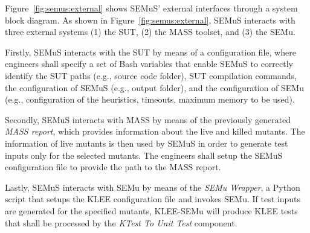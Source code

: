 Figure~\ref{fig:semus:external} shows SEMuS' external interfaces through a system block diagram.
As shown in Figure~\ref{fig:semus:external}, SEMuS interacts with three external systems (1) the SUT, (2) the MASS toolset, and (3) the SEMu.

Firstly, SEMuS interacts with the SUT by means of a configuration file, where engineers shall specify a set of Bash variables that enable SEMuS to correctly identify the SUT paths (e.g., source code folder), SUT compilation commands, the configuration of SEMuS (e.g., output folder), and the configuration of SEMu (e.g., configuration of the heuristics, timeouts, maximum memory to be used).

Secondly, SEMuS interacts with MASS by means of the previously generated \emph{MASS report}, which provides information about the live and killed mutants. The information of live mutants is then used by SEMuS in order to generate test inputs only for the selected mutants. 
The engineers shall setup the SEMuS configuration file to provide the path to the MASS report.

Lastly, SEMuS interacts with SEMu by means of the \emph{SEMu Wrapper}, a Python script that setups the KLEE configuration file and invokes SEMu. If test inputs are generated for the specified mutants, KLEE-SEMu will produce KLEE tests that shall be processed by the \emph{KTest To Unit Test} component.



